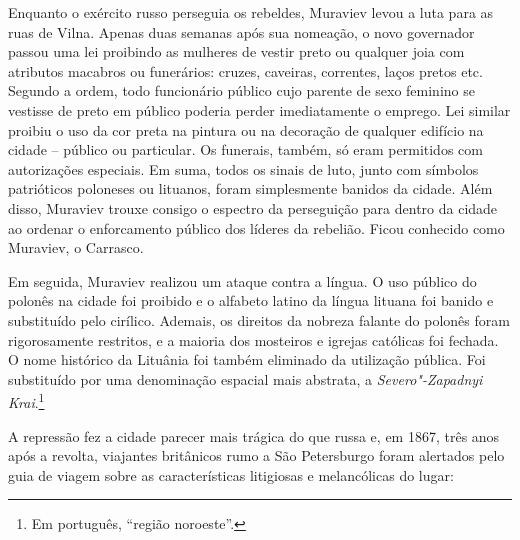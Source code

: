 Enquanto o exército russo perseguia os rebeldes, Muraviev levou a luta
para as ruas de Vilna. Apenas duas semanas após sua nomeação, o novo
governador passou uma lei proibindo as mulheres de vestir preto ou
qualquer joia com atributos macabros ou funerários: cruzes, caveiras,
correntes, laços pretos etc. Segundo a ordem, todo funcionário público
cujo parente de sexo feminino se vestisse de preto em público poderia
perder imediatamente o emprego. Lei similar proibiu o uso da cor preta
na pintura ou na decoração de qualquer edifício na cidade -- público ou
particular. Os funerais, também, só eram permitidos com autorizações
especiais. Em suma, todos os sinais de luto, junto com símbolos
patrióticos poloneses ou lituanos, foram simplesmente banidos da cidade.
Além disso, Muraviev trouxe consigo o espectro da perseguição para
dentro da cidade ao ordenar o enforcamento público dos líderes da
rebelião. Ficou conhecido como Muraviev, o Carrasco.

Em seguida, Muraviev realizou um ataque contra a língua. O uso público
do polonês na cidade foi proibido e o alfabeto latino da língua lituana
foi banido e substituído pelo cirílico. Ademais, os direitos da nobreza
falante do polonês foram rigorosamente restritos, e a maioria dos
mosteiros e igrejas católicas foi fechada. O nome histórico da Lituânia
foi também eliminado da utilização pública. Foi substituído por uma
denominação espacial mais abstrata, a \textit{Severo"-Zapadnyi Krai}.\footnote{Em português, ``região noroeste''.}

A repressão fez a cidade parecer mais trágica do que russa e, em 1867,
três anos após a revolta, viajantes britânicos rumo a São Petersburgo
foram alertados pelo guia de viagem sobre as características litigiosas
e melancólicas do lugar:

